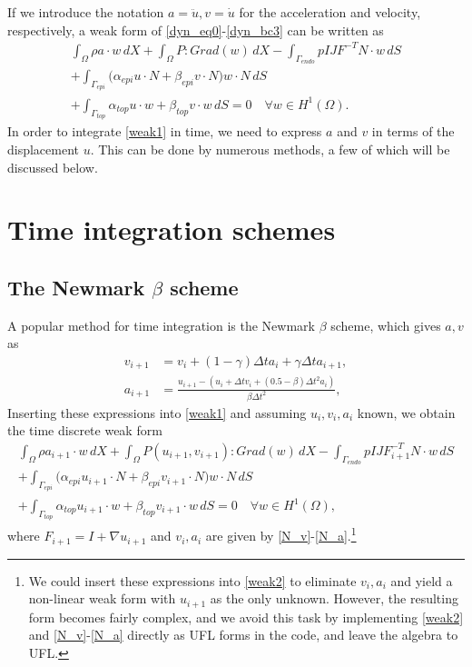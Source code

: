 \documentclass[a4paper,10pt]{article}
\begin{document}
If we introduce the notation $a= \ddot{u}, v=\dot{u}$
for the acceleration and velocity, respectively, a weak form
of \eqref{dyn_eq0}-\eqref{dyn_bc3} can be written as
\begin{equation}
\begin{aligned}
\int_{\Omega} \rho a \cdot w \, dX + \int_{\Omega} P:Grad(w) \, dX -\int_{\Gamma_{endo}} p I JF^{-T}N \cdot w \, dS  \\
+\int_{\Gamma_{epi}} \big(\alpha_{epi} u \cdot N + \beta_{epi} v \cdot N \big) w \cdot N \, dS  \\
+\int_{\Gamma_{top}} \alpha_{top} u \cdot w + \beta_{top} v \cdot w \, dS = 0 \quad \forall w \in H^1(\Omega).
\end{aligned}\label{weak1}
\end{equation}
In order to integrate \eqref{weak1} in time, we need to express $a$ and $v$ in
terms of the displacement $u$. This can be done by numerous methods, a few of
which will be discussed below.

\section{Time integration schemes}
\subsection{The Newmark $\beta$ scheme}
A popular method for time integration is the Newmark $\beta$ scheme,
which gives $a,v$ as
\begin{align}
v_{i+1} &= v_i + (1-\gamma) \Delta t a_i + \gamma \Delta t a_{i+1}, \label{N_v}\\
a_{i+1} &= \frac{u_{i+1} - (u_i + \Delta t v_i + (0.5 - \beta) \Delta t^2 a_i)}{\beta \Delta t^2}, \label{N_a}
\end{align}
Inserting these expressions into \eqref{weak1} and assuming $u_i,v_i,a_i$ known,
we obtain the time discrete weak form
\begin{equation}
\begin{aligned}
\int_{\Omega} \rho a_{i+1} \cdot w \, dX + \int_{\Omega} P(u_{i+1},v_{i+1}):Grad(w) \, dX -\int_{\Gamma_{endo}} p I JF_{i+1}^{-T}N \cdot w \, dS  \\
+\int_{\Gamma_{epi}} \big(\alpha_{epi} u_{i+1} \cdot N + \beta_{epi} v_{i+1} \cdot N \big) w \cdot N \, dS  \\
+\int_{\Gamma_{top}} \alpha_{top} u_{i+1} \cdot w + \beta_{top} v_{i+1} \cdot w \, dS = 0 \quad \forall w \in H^1(\Omega),
\end{aligned}\label{weak2}
\end{equation}
where $F_{i+1} = I + \nabla u_{i+1}$ and $v_i,a_i$ are given by
\eqref{N_v}-\eqref{N_a}.\footnote{We could insert these expressions into \eqref{weak2} to eliminate $v_i,a_i$
and yield a non-linear weak form with $u_{i+1}$ as the only unknown. However, the
resulting form becomes fairly complex, and we avoid this task by implementing \eqref{weak2} and
\eqref{N_v}-\eqref{N_a} directly as UFL forms in the code, and leave the algebra to UFL.}
\end{document}
